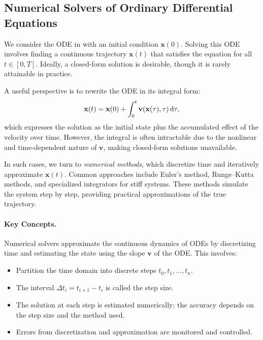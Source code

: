 \subsection{Numerical Solvers of Ordinary Differential Equations}\label{app:de-solver}
We consider the ODE in  with an initial condition $\mathbf{x}(0)$. Solving this ODE involves finding a continuous trajectory $\mathbf{x}(t)$ that satisfies the equation for all $t \in [0, T]$. Ideally, a closed-form solution is desirable, though it is rarely attainable in practice.

A useful perspective is to rewrite the ODE in its integral form:
\begin{equation}
\label{eq:integral_form}
\mathbf{x}(t) = \mathbf{x}(0) + \int_0^t \mathbf{v}(\mathbf{x}(\tau), \tau)\mathop{}\!\mathrm{d} \tau,
\end{equation}
which expresses the solution as the initial state plus the accumulated effect of the velocity over time. However, the integral is often intractable due to the nonlinear and time-dependent nature of $\mathbf{v}$, making closed-form solutions unavailable.

In such cases, we turn to \emph{numerical methods}, which discretize time and iteratively approximate $\mathbf{x}(t)$. Common approaches include Euler's method, Runge–Kutta methods, and specialized integrators for stiff systems. These methods simulate the system step by step, providing practical approximations of the true trajectory.





\paragraph{Key Concepts.}
Numerical solvers approximate the continuous dynamics of ODEs by discretizing time and estimating the state using the slope $\mathbf{v}$ of the ODE. This involves:
\begin{itemize}
    \item {} Partition the time domain into discrete steps $t_0, t_1, \dots, t_n$.
    \item {} The interval $\Delta t_i = t_{i+1} - t_i$ is called the step size.
    \item {} The solution at each step is estimated numerically; the accuracy depends on the step size and the method used.
    \item {} Errors from discretization and approximation are monitored and controlled.
\end{itemize}

